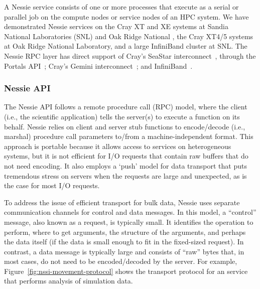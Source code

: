 A Nessie service consists of one or more processes that execute as a serial
or parallel job on the compute nodes or service nodes of an HPC system. We have
demonstrated Nessie services on the Cray XT and XE systems at Sandia National
Laboratories (SNL) and Oak Ridge National , the Cray XT4/5 systems at Oak Ridge National Laboratory,
and a large InfiniBand
cluster at SNL. The Nessie RPC layer has direct support of Cray's SeaStar
interconnect~\cite{brightwell:2006:seastar}, through the Portals
API~\cite{brightwell:2002:portals3}; Cray's Gemini
interconnect~\cite{alverson:2010:gemini}; and
InfiniBand~\cite{infiniband:specification}.  

\subsubsection{Nessie API}

The Nessie API follows a remote procedure call (RPC) model, where the client
(i.e., the scientific application) tells the server(s) to execute a function on
its behalf.  Nessie relies on client and server stub functions to encode/decode
(i.e., marshal) procedure call parameters to/from a machine-independent format.
This approach is portable because it allows access to services on heterogeneous
systems, but it is not efficient for I/O requests that contain raw buffers that
do not need encoding. It also employs a `push' model for data transport that
puts tremendous stress on servers when the requests are large and unexpected,
as is the case for most I/O requests.


To address the issue of efficient transport for bulk data, Nessie uses separate
communication channels for control and data messages. In this model, a ``control''
message, also known as a request, is typically small. It identifies the
operation to perform, where to get arguments, the structure of the arguments,
and perhaps the data itself (if the data is small enough to fit in the
fixed-sized request).  In contrast, a data message is typically large and
consists of ``raw'' bytes that, in most cases, do not need to be
encoded/decoded by the server. For example,
Figure~\ref{fig:nssi-movement-protocol} shows the transport protocol for an
\intransit service that performs analysis of simulation data.

